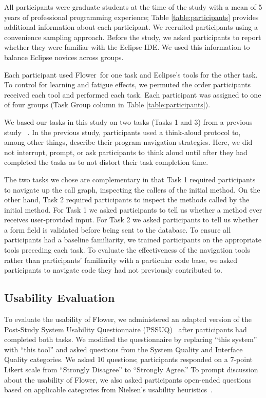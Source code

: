 \documentclass[conference]{IEEEtran}
\newcommand{\toolName}{Flower}
\begin{document}
All participants were graduate students at the time of the study with a mean of 5 years of professional programming experience; Table \ref{table:participants} provides additional information about each participant. We recruited participants using a convenience sampling approach. 
Before the study, we asked participants to report whether they were familiar with the Eclipse IDE. We used this information to balance Eclipse novices across groups.

Each participant used \toolName~for one task and Eclipse's tools for the other task.
To control for learning and fatigue effects, we permuted the order participants received each tool and performed each task. 
Each participant was assigned to one of four groups (Task Group column in Table \ref{table:participants}).

We based our tasks in this study on two tasks (Tasks 1 and 3) from a previous study ~\cite{Smith2015}.
In the previous study, participants used a think-aloud protocol to, among other things, describe their program navigation strategies.
Here, we did not interrupt, prompt, or ask participants to think aloud until after they had completed the tasks as to not distort their task completion time.

The two tasks we chose are complementary in that Task 1 required participants to navigate up the call graph, inspecting the callers of the initial method. 
On the other hand, Task 2 required participants to inspect the methods called by the initial method.
For Task 1 we asked participants to tell us whether a method ever receives user-provided input.
For Task 2 we asked participants to tell us whether a form field is validated before being sent to the database.
To ensure all participants had a baseline familiarity, we trained participants on the appropriate tools preceding each task. 
To evaluate the effectiveness of the navigation tools rather than participants' familiarity with a particular code base, we asked participants to navigate code they had not previously contributed to. 


\subsection{Usability Evaluation}
\label{UsabilityMethodology}
To evaluate the usability of \toolName, we administered an adapted version of the Post-Study System Usability Questionnaire (PSSUQ)~\cite{Lewis95ibmcomputer} after participants had completed both tasks. We modified the questionnaire by replacing ``this system'' with ``this tool'' and asked questions from the System Quality and Interface Quality categories. We asked 10 questions; participants responded on a 7-point Likert scale from ``Strongly Disagree'' to ``Strongly Agree.'' 	
To prompt discussion about the usability of \toolName, we also asked participants open-ended questions based on applicable categories from Nielsen's usability heuristics~\cite{Nielsen1992}.
\end{document}
